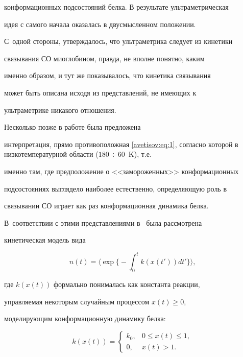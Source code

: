 конформационных подсостояний белка. В результате ультраметрическая

идея с самого начала оказалась в двусмысленном положении. 

С~одной стороны, утверждалось, что ультраметрика следует из кинетики

связывания СО  миоглобином, правда, не вполне понятно, каким

именно образом, и тут же  показывалось, что кинетика связывания

может быть описана исходя из представлений, не имеющих к

ультраметрике никакого отношения.



Несколько позже в работе \cite{avetisov_bikulov_zubarev:bib:Zharikov-2} была предложена

интерпретация, прямо противоположная \eqref{avetisov:eq:1}, согласно которой в низкотемпературной области ($180\div60$~K), т.е.

именно там, где предположение о <<замороженных>> конформационных

подсостояниях выглядело наиболее естественно, определяющую роль в

связывании СО играет как раз конформационная динамика белка.

В~соответствии с этими представлениями в~\cite{avetisov_bikulov_zubarev:bib:Zharikov-2} была рассмотрена

кинетическая модель вида

\begin{equation}

n(t)=\biggl\langle \exp{\biggl\{-\int_0^t{k(x(t'))dt'\biggr\}}}\biggr\rangle,

\label{avetisov:eq:2}

\end{equation}

где  $k(x(t))$ формально понималась как константа реакции,

управляемая некоторым случайным процессом $x(t)\geq 0$,

моделирующим  конформационную динамику  белка:

\begin{equation}

k(x(t))=\begin{cases}

k_0, &  0\leq x(t) \leq 1,\\

0, & x(t)>1.

\end{cases} \label{avetisov:eq:3}

\end{equation}


